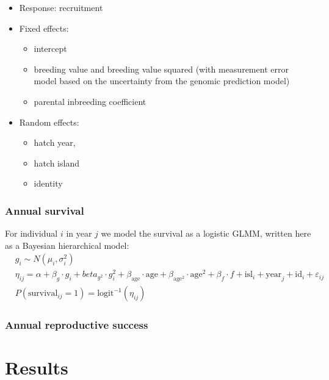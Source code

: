\documentclass[dvipsnames]{article}
\begin{document}
\begin{itemize}
\begin{itemize}
        \item Response: recruitment
        \item Fixed effects: \begin{itemize}
            \item intercept
            \item breeding value and breeding value squared (with measurement error model based on the uncertainty from the genomic prediction model)
            \item parental inbreeding coefficient
        \end{itemize} 
        \item Random effects: \begin{itemize}
            \item hatch year, 
            \item hatch island
            \item identity
        \end{itemize}
    \end{itemize}
\end{itemize}
\clearpage

\subsubsection*{Annual survival}

For individual $i$ in year $j$ we model the survival as a logistic GLMM, written here as a Bayesian hierarchical model:
\begin{align*}
    &g_i \sim N(\mu_i, \sigma_i^2) \\
    &\eta_{ij} = \alpha + \beta_g \cdot g_i + beta_{g^2} \cdot g_i^2 + \beta_\text{age} \cdot \text{age} + \beta_{\text{age}^2} \cdot \text{age}^2 + \beta_f \cdot f + \text{isl}_i + \text{year}_j + \text{id}_i + \varepsilon_{ij}\\
    &P(\text{survival}_{ij} = 1) = \text{logit}^{-1}(\eta_{ij})
\end{align*}


\subsubsection*{Annual reproductive success}

\section*{Results}
\end{document}
